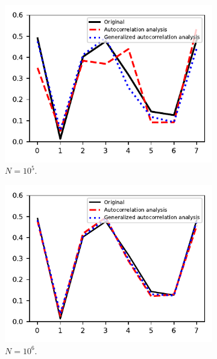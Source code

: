 \documentclass{article}
\begin{document}
\begin{figure}[!tb]
	\begin{subfigure}[ht]{0.245\textwidth}
		\centering
		\includegraphics[width=\columnwidth]{figures/recovery_1.pdf}
		\caption{$N = 10^5$.}
	\end{subfigure}
	\hfill
	\begin{subfigure}[ht]{0.245\textwidth}
		\centering
		\includegraphics[width=\columnwidth]{figures/recovery_2.pdf}
		\caption{$N = 10^6$.}
	\end{subfigure}
	\hfill
	\begin{subfigure}[ht]{0.245\textwidth}
		\centering

\end{subfigure}
\end{figure}
\end{document}
